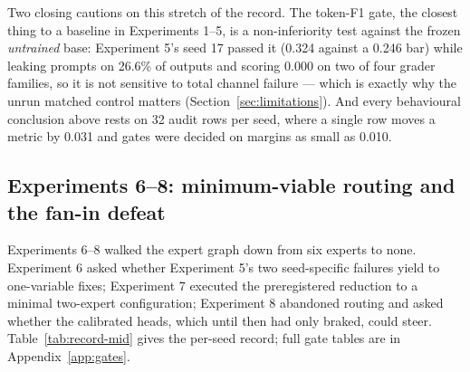 \documentclass[10pt,a4paper]{article}
\begin{document}
Two closing cautions on this stretch of the record. The token-F1 gate, the closest thing to a baseline in Experiments 1--5, is a non-inferiority test against the frozen \emph{untrained} base: Experiment 5's seed 17 passed it (0.324 against a 0.246 bar) while leaking prompts on 26.6\% of outputs and scoring 0.000 on two of four grader families, so it is not sensitive to total channel failure --- which is exactly why the unrun matched control matters (Section~\ref{sec:limitations}). And every behavioural conclusion above rests on 32 audit rows per seed, where a single row moves a metric by 0.031 and gates were decided on margins as small as 0.010.

\subsection{Experiments 6--8: minimum-viable routing and the fan-in defeat}\label{sec:record-mid}

Experiments 6--8 walked the expert graph down from six experts to none. Experiment 6 asked whether Experiment 5's two seed-specific failures yield to one-variable fixes; Experiment 7 executed the preregistered reduction to a minimal two-expert configuration; Experiment 8 abandoned routing and asked whether the calibrated heads, which until then had only braked, could steer. Table~\ref{tab:record-mid} gives the per-seed record; full gate tables are in Appendix~\ref{app:gates}.
\end{document}
